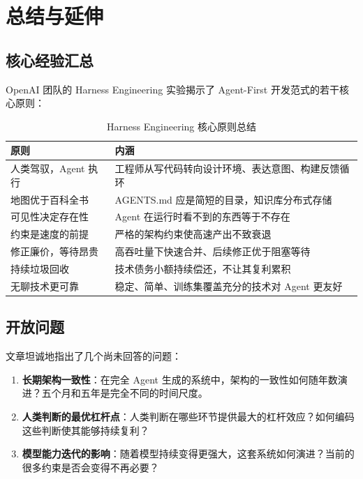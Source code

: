 \section{总结与延伸}

\subsection{核心经验汇总}

OpenAI 团队的 Harness Engineering 实验揭示了 Agent-First 开发范式的若干核心原则：

\begin{table}[H]
\centering
\small
\begin{tabular}{p{4cm}p{9cm}}
\toprule
\textbf{原则} & \textbf{内涵} \\
\midrule
人类驾驭，Agent 执行 & 工程师从写代码转向设计环境、表达意图、构建反馈循环 \\
地图优于百科全书 & AGENTS.md 应是简短的目录，知识库分布式存储 \\
可见性决定存在性 & Agent 在运行时看不到的东西等于不存在 \\
约束是速度的前提 & 严格的架构约束使高速产出不致衰退 \\
修正廉价，等待昂贵 & 高吞吐量下快速合并、后续修正优于阻塞等待 \\
持续垃圾回收 & 技术债务小额持续偿还，不让其复利累积 \\
无聊技术更可靠 & 稳定、简单、训练集覆盖充分的技术对 Agent 更友好 \\
\bottomrule
\end{tabular}
\caption{Harness Engineering 核心原则总结}
\end{table}

\subsection{开放问题}

文章坦诚地指出了几个尚未回答的问题：

\begin{enumerate}[nosep]
  \item \textbf{长期架构一致性}：在完全 Agent 生成的系统中，架构的一致性如何随年数演进？五个月和五年是完全不同的时间尺度。
  \item \textbf{人类判断的最优杠杆点}：人类判断在哪些环节提供最大的杠杆效应？如何编码这些判断使其能够持续复利？
  \item \textbf{模型能力迭代的影响}：随着模型持续变得更强大，这套系统如何演进？当前的很多约束是否会变得不再必要？
\end{enumerate}

